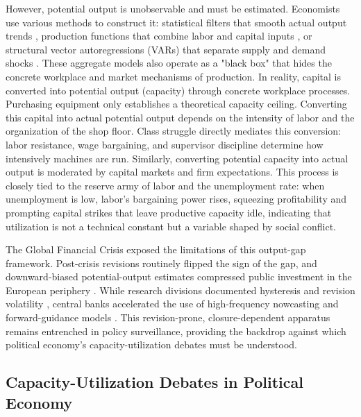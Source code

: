 \documentclass[11pt]{article}
\begin{document}
However, potential output is unobservable and must be estimated. Economists use various methods to construct it: statistical filters that smooth actual output trends \citep{HodrickPrescott1997, BaxterKing1999, BeveridgeNelson1981, Hamilton2018}, production functions that combine labor and capital inputs \citep{CBO2004PotentialGDP, HavikEtAl2014, Alichi2015}, or structural vector autoregressions (VARs) that separate supply and demand shocks \citep{BlanchardQuah1989}. These aggregate models also operate as a "black box" that hides the concrete workplace and market mechanisms of production. In reality, capital is converted into potential output (capacity) through concrete workplace processes. Purchasing equipment only establishes a theoretical capacity ceiling. Converting this capital into actual potential output depends on the intensity of labor and the organization of the shop floor. Class struggle directly mediates this conversion: labor resistance, wage bargaining, and supervisor discipline determine how intensively machines are run. Similarly, converting potential capacity into actual output is moderated by capital markets and firm expectations. This process is closely tied to the reserve army of labor and the unemployment rate: when unemployment is low, labor's bargaining power rises, squeezing profitability and prompting capital strikes that leave productive capacity idle, indicating that utilization is not a technical constant but a variable shaped by social conflict.

The Global Financial Crisis exposed the limitations of this output-gap framework. Post-crisis revisions routinely flipped the sign of the gap, and downward-biased potential-output estimates compressed public investment in the European periphery \citep{Heimberger2017, Heimberger2020}. While research divisions documented hysteresis and revision volatility \citep{CerraSaxena2017, CerraFatasSaxena2023, BarkemaGudmundssonMrkaic2020}, central banks accelerated the use of high-frequency nowcasting and forward-guidance models \citep{AastveitTrovik2014, Berger2023, Foster2024}. This revision-prone, closure-dependent apparatus remains entrenched in policy surveillance, providing the backdrop against which political economy's capacity-utilization debates must be understood.

\subsection{Capacity-Utilization Debates in Political Economy}
\label{subsec:pe_utilization_debates}
\end{document}
